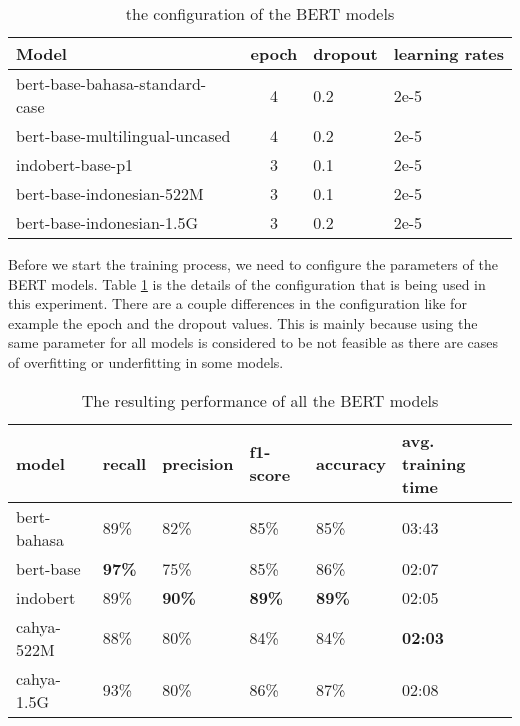 \begin{table}[h]
  \centering
  \caption{the configuration of the BERT models}
  \label{tab:multi_bert_config}
  \begin{tabular}{|p{.5\linewidth}|c|l|p{.12\linewidth} |}
    \hline
    Model                          & epoch & dropout & learning rates \\ \hline
    bert-base-bahasa-standard-case & 4     & 0.2     & 2e-5           \\ \hline
    bert-base-multilingual-uncased & 4     & 0.2     & 2e-5           \\ \hline
    indobert-base-p1               & 3     & 0.1     & 2e-5           \\ \hline
    bert-base-indonesian-522M      & 3     & 0.1     & 2e-5           \\ \hline
    bert-base-indonesian-1.5G      & 3     & 0.2     & 2e-5           \\ \hline
  \end{tabular}
\end{table}

Before we start the training process, we need to configure the parameters of the BERT models. Table \ref{tab:multi_bert_config} is the details of the configuration that is being used in this experiment. There are a couple differences in the configuration like for example the epoch and the dropout values. This is mainly because using the same parameter for all models is considered to be not feasible as there are cases of overfitting or underfitting in some models.

\begin{table}[h]
  \centering
  \caption{The resulting performance of all the BERT models}
  \label{tab:model_bert_result}
  \begin{tabular}{|l|l|l|l|l|p{.12\linewidth}|}
    \hline
    \textbf{model} & \textbf{recall} & \textbf{precision} & \textbf{f1-score} & \textbf{accuracy} & \textbf{avg. training time} \\ \hline
    bert-bahasa    & 89\%            & 82\%               & 85\%              & 85\%              & 03:43                       \\ \hline
    bert-base      & \textbf{97\%}   & 75\%               & 85\%              & 86\%              & 02:07                       \\ \hline
    indobert       & 89\%            & \textbf{90\%}      & \textbf{89\%}     & \textbf{89\%}     & 02:05                       \\ \hline
    cahya-522M     & 88\%            & 80\%               & 84\%              & 84\%              & \textbf{02:03}              \\ \hline
    cahya-1.5G     & 93\%            & 80\%               & 86\%              & 87\%              & 02:08                       \\ \hline
  \end{tabular}
\end{table}

